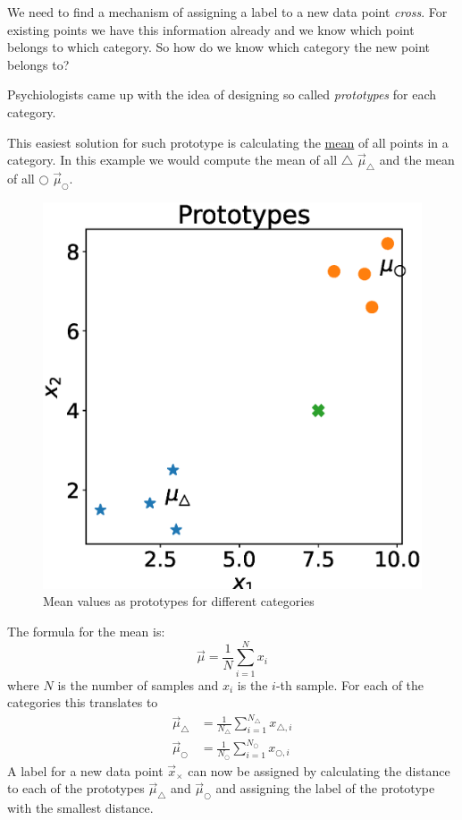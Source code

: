 We need to find a mechanism of assigning a label to a new data point \textit{cross}.
For existing points we have this information already and we know which point belongs to which category. 
So how do we know which category the new point belongs to?

Psychiologists came up with the idea of designing so called \textit{prototypes} for each category.

This easiest solution for such prototype is calculating the \underline{mean} of all points in a category.
In this example we would compute the mean of all $\bigtriangleup$ $\vec{\mu}_\bigtriangleup$ and the mean of all $\bigcirc$ $\vec{\mu}_\bigcirc$.
\begin{figure}[h]
  \centering
  \includegraphics[width=.75\textwidth]{images/prototypes_2.eps}
  \caption{Mean values as prototypes for different categories}
  \label{fig:prototypes_2}
\end{figure}

The formula for the mean is:
\begin{equation}
  \vec{\mu} = \frac{1}{N} \sum_{i=1}^{N} x_i
  \label{eq:mean}
\end{equation}
where $N$ is the number of samples and $x_i$ is the $i$-th sample.
For each of the categories this translates to
\begin{align}
  \vec{\mu}_\bigtriangleup &= \frac{1}{N_\bigtriangleup} \sum_{i=1}^{N_\bigtriangleup} x_{\bigtriangleup, i} \\
  \vec{\mu}_\bigcirc &= \frac{1}{N_\bigcirc} \sum_{i=1}^{N_\bigcirc} x_{\bigcirc, i}
\end{align}
A label for a new data point $\vec{x}_{\times}$ can now be assigned by calculating the distance to each of the prototypes $\vec{\mu}_{\bigtriangleup}$ and $\vec{\mu}_{\bigcirc}$ and assigning the label of the prototype with the smallest distance.

